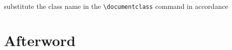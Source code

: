substitute the class name in the \verb|\documentclass| command in accordance
\begin{document}
  \tableofcontents
  \blinddocument
  \chapter*{Afterword}
  \Blindtext[10]
  
\end{document}
